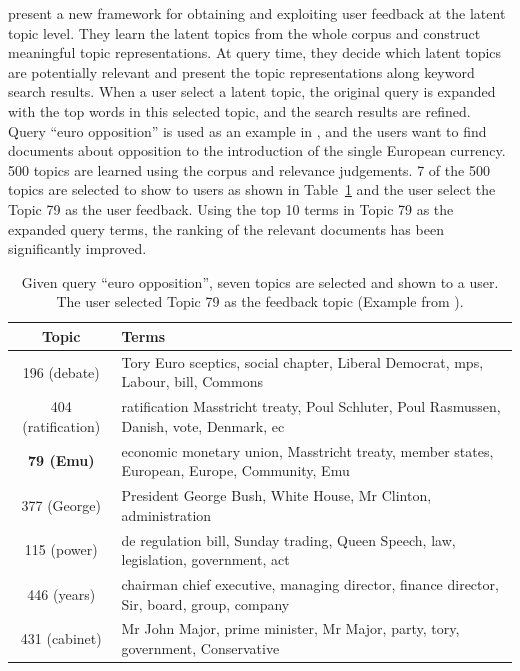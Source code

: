 \citet{Andrzejewski-2011} present a new framework for obtaining and
exploiting user feedback at the latent topic level. They learn the
latent topics from the whole corpus and construct meaningful topic
representations. At query time, they decide which latent topics are
potentially relevant and present the topic representations along
keyword search results. When a user select a latent topic, the
original query is expanded with the top words in this selected topic,
and the search results are refined. 
Query ``euro opposition'' is used as an example in \citet{Andrzejewski-2011},
and the users want to find documents about opposition to the introduction of
the single European currency. 500 topics are learned using the corpus and relevance
judgements. 7 of the 500 topics are selected to show to users as shown in
Table~\ref{tab:topic-feedback} and the user select the Topic 79 as the user feedback.
Using the top 10 terms in Topic 79 as the expanded query terms, the ranking of
the relevant documents has been significantly improved.

\begin{table}[!tp]
\caption{Given query ``euro opposition'', seven topics are selected and shown to a user. The user selected Topic 79
as the feedback topic (Example from \citet{Andrzejewski-2011}).}
\label{tab:topic-feedback}
\begin{center}
\footnotesize
\setlength\tabcolsep{3pt}
\begin{tabular}{c  p{9cm} } \hline
\rowcolor{gray!50}
Topic & Terms \\ \hline \hline
196 (debate) & Tory Euro sceptics, social chapter, Liberal Democrat, mps, Labour, bill, Commons \\
404 (ratification) & ratification Masstricht treaty, Poul Schluter, Poul Rasmussen, Danish, vote, Denmark, ec \\
\textbf{79 (Emu)} & economic monetary union, Masstricht treaty, member states, European, Europe, Community, Emu \\
377 (George) & President George Bush, White House, Mr Clinton, administration \\
115 (power) & de regulation bill, Sunday trading, Queen Speech, law, legislation, government, act \\
446 (years) & chairman chief executive, managing director, finance director, Sir, board, group, company \\
431 (cabinet) & Mr John Major, prime minister, Mr Major, party, tory, government, Conservative \\
\hline
\end{tabular}
\end{center}
\end{table}

